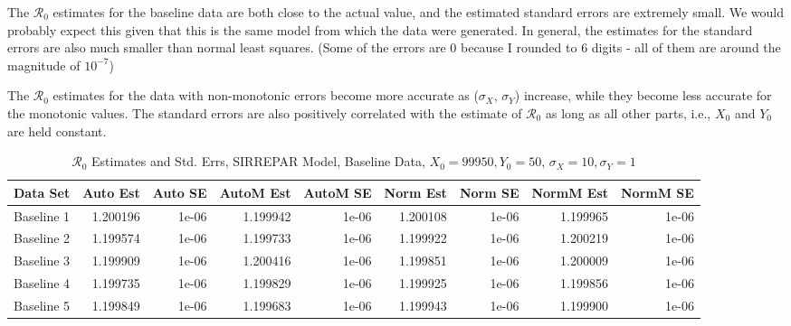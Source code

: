 \documentclass[12pt]{article}
\newcommand{\rr}{\ensuremath{\mathcal{R}_0}}
\begin{document}
The $\rr$ estimates for the baseline data are both close to the actual value, and the estimated standard errors are extremely small. We would probably expect this given that this is the same model from which the data were generated. In general, the estimates for the standard errors are also much smaller than normal least squares. (Some of the errors are 0 because I rounded to 6 digits - all of them are around the magnitude of $10 ^ {-7}$)

The $\rr$ estimates for the data with non-monotonic errors become more accurate as ($\sigma_X$, $\sigma_Y$) increase, while they become less accurate for the monotonic values. The standard errors are also positively correlated with the estimate of $\rr$ as long as all other parts, i.e., $X_0$ and $Y_0$ are held constant.

\begin{table}[H]
	
	\caption{$\rr$ Estimates and Std. Errs, SIRREPAR Model,
		Baseline Data, $X_0 = 99950, Y_0 = 50$, 
		$\sigma_X = 10, \sigma_Y = 1$}
	\begin{footnotesize}
		\hskip -1cm
		\begin{tabular}{l|r|r|r|r|r|r|r|r}
			\hline
			Data Set & Auto Est & Auto SE & AutoM Est & AutoM SE & Norm Est & Norm SE & NormM Est & NormM SE\\
			\hline
			Baseline 1 & 1.200196 & 1e-06 & 1.199942 & 1e-06 & 1.200108 & 1e-06 & 1.199965 & 1e-06\\
			\hline
			Baseline 2 & 1.199574 & 1e-06 & 1.199733 & 1e-06 & 1.199922 & 1e-06 & 1.200219 & 1e-06\\
			\hline
			Baseline 3 & 1.199909 & 1e-06 & 1.200416 & 1e-06 & 1.199851 & 1e-06 & 1.200009 & 1e-06\\
			\hline
			Baseline 4 & 1.199735 & 1e-06 & 1.199829 & 1e-06 & 1.199925 & 1e-06 & 1.199856 & 1e-06\\
			\hline
			Baseline 5 & 1.199849 & 1e-06 & 1.199683 & 1e-06 & 1.199943 & 1e-06 & 1.199900 & 1e-06\\
			\hline
		\end{tabular}
	\end{footnotesize}
\end{table}
\end{document}
